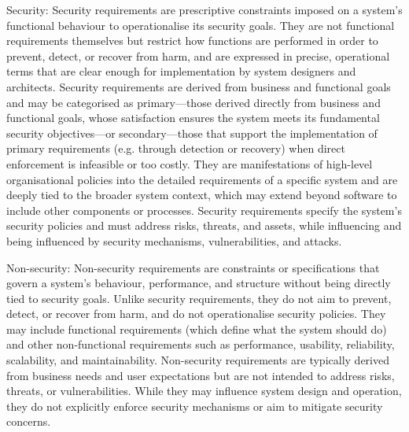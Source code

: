 Security: Security requirements are prescriptive constraints imposed on a system's functional behaviour to operationalise its security goals. They are not functional requirements themselves but restrict how functions are performed in order to prevent, detect, or recover from harm, and are expressed in precise, operational terms that are clear enough for implementation by system designers and architects. Security requirements are derived from business and functional goals and may be categorised as primary---those derived directly from business and functional goals, whose satisfaction ensures the system meets its fundamental security objectives---or secondary---those that support the implementation of primary requirements (e.g. through detection or recovery) when direct enforcement is infeasible or too costly. They are manifestations of high-level organisational policies into the detailed requirements of a specific system and are deeply tied to the broader system context, which may extend beyond software to include other components or processes. Security requirements specify the system's security policies and must address risks, threats, and assets, while influencing and being influenced by security mechanisms, vulnerabilities, and attacks.

Non-security: Non-security requirements are constraints or specifications that govern a system's behaviour, performance, and structure without being directly tied to security goals. Unlike security requirements, they do not aim to prevent, detect, or recover from harm, and do not operationalise security policies. They may include functional requirements (which define what the system should do) and other non-functional requirements such as performance, usability, reliability, scalability, and maintainability. Non-security requirements are typically derived from business needs and user expectations but are not intended to address risks, threats, or vulnerabilities. While they may influence system design and operation, they do not explicitly enforce security mechanisms or aim to mitigate security concerns.
